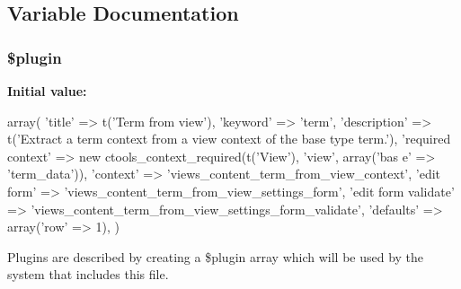 \subsection{Variable Documentation}
\hypertarget{term__from__view_8inc_ada8a7130088351710bb02ed622d6bf65}{
\subsubsection[{\$plugin}]{\setlength{\rightskip}{0pt plus 5cm}\$plugin}}
\label{term__from__view_8inc_ada8a7130088351710bb02ed622d6bf65}
{\bfseries Initial value:}
\begin{DoxyCode}
 array(
  'title' => t('Term from view'),
  'keyword' => 'term',
  'description' => t('Extract a term context from a view context of the base type
       term.'),
  'required context' => new ctools_context_required(t('View'), 'view', array('bas
      e' => 'term_data')),
  'context' => 'views_content_term_from_view_context',
  'edit form' => 'views_content_term_from_view_settings_form',
  'edit form validate' => 'views_content_term_from_view_settings_form_validate',
  'defaults' => array('row' => 1),
)
\end{DoxyCode}
Plugins are described by creating a \$plugin array which will be used by the system that includes this file. 